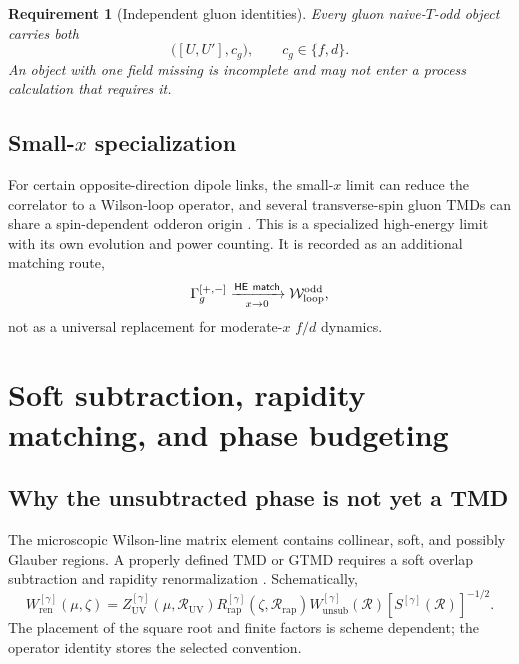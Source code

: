 \documentclass[11pt]{article}
\newtheorem{requirement}[definition]{Requirement}
\newcommand{\cR}{\mathcal R}
\newcommand{\cW}{\mathcal W}
\newcommand{\unsub}{\mathrm{unsub}}
\newcommand{\ren}{\mathrm{ren}}
\newcommand{\odd}{\mathrm{odd}}
\newcommand{\rap}{\mathrm{rap}}
\newcommand{\UV}{\mathrm{UV}}
\begin{document}
\begin{requirement}[Independent gluon identities]
\label{req:independent-gluon-identities}
Every gluon naive-\(T\)-odd object carries both
\begin{equation}
 \bigl([U,U'],c_g\bigr),
 \qquad c_g\in\{f,d\}.
\label{eq:gluon-two-label-requirement}
\end{equation}
An object with one field missing is incomplete and may not enter a process
calculation that requires it.
\end{requirement}

\subsection{Small-\texorpdfstring{\(x\)}{x} specialization}

For certain opposite-direction dipole links, the small-\(x\) limit can reduce
the correlator to a Wilson-loop operator, and several transverse-spin gluon
TMDs can share a spin-dependent odderon origin
\cite{BoerEchevarriaMuldersZhou2016,Boer2016}.  This is a specialized
high-energy limit with its own evolution and power counting.  It is recorded
as an additional matching route,
\begin{equation}
 \Gamma_g^{[+,-]}
 \xrightarrow[x\to0]{\mathsf{HE\ match}}
 \cW_{\rm loop}^{\odd},
\label{eq:small-x-wilson-loop-route}
\end{equation}
not as a universal replacement for moderate-\(x\) \(f/d\) dynamics.

\section{Soft subtraction, rapidity matching, and phase budgeting}
\label{sec:soft-subtraction}

\subsection{Why the unsubtracted phase is not yet a TMD}

The microscopic Wilson-line matrix element contains collinear, soft, and
possibly Glauber regions.  A properly defined TMD or GTMD requires a soft
overlap subtraction and rapidity renormalization
\cite{JiMaYuan2004,Collins2011,EchevarriaGTMD2016}.  Schematically,
\begin{equation}
 W_{\ren}^{[\gamma]}(\mu,\zeta)
 =Z_{\UV}^{[\gamma]}(\mu,\cR_{\UV})
 R_{\rap}^{[\gamma]}(\zeta,\cR_{\rap})
 W_{\unsub}^{[\gamma]}(\cR)
 \left[S^{[\gamma]}(\cR)\right]^{-1/2}.
\label{eq:renormalized-tmd-gtmd}
\end{equation}
The placement of the square root and finite factors is scheme dependent; the
operator identity stores the selected convention.
\end{document}
